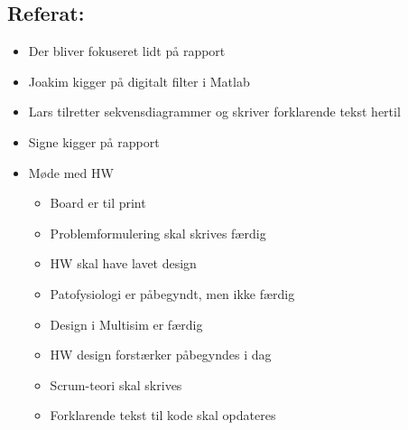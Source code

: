 \documentclass[a4paper,11pt,oneside]{memoir}
\newcommand{\R}{\ensuremath{\mathbb{R}}}
\begin{document}
\subsection{Referat:}
\begin{itemize}
\item Der bliver fokuseret lidt på rapport
\item Joakim kigger på digitalt filter i Matlab
\item Lars tilretter sekvensdiagrammer og skriver forklarende tekst hertil
\item Signe kigger på rapport 
\item Møde med HW
\begin{itemize}
\item Board er til print
\item Problemformulering skal skrives færdig
\item HW skal have lavet design 
\item Patofysiologi er påbegyndt, men ikke færdig
\item Design i Multisim er færdig
\item HW design forstærker påbegyndes i dag 
\item Scrum-teori skal skrives 
\item Forklarende tekst til kode skal opdateres  
\end{itemize}
\end{itemize}


\newpage



\end{document}

